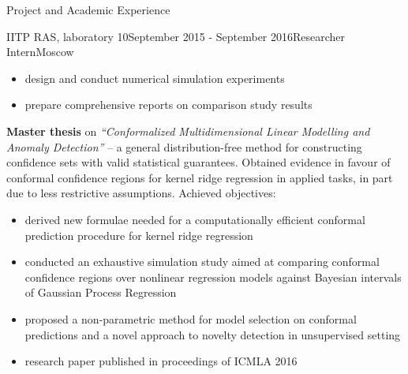 \documentclass{resume} %
\begin{document}
\begin{rSection}{Project and Academic Experience}
\begin{rSubsection}{IITP RAS, laboratory 10}{September 2015 - September 2016}{Researcher Intern}{Moscow}
\begin{itemize}
        \item design and conduct numerical simulation experiments

        \item prepare comprehensive reports on comparison study results
    \end{itemize}

    \medskip
    \item \textbf{Master thesis} on \textit{``Conformalized Multidimensional Linear
    Modelling and Anomaly Detection''} -- a general distribution-free method for
    constructing confidence sets with valid statistical guarantees. Obtained evidence
    in favour of conformal confidence regions for kernel ridge regression in applied
    tasks, in part due to less restrictive assumptions.
    Achieved objectives: \begin{itemize}
        \item derived new formulae needed for a computationally efficient conformal
        prediction procedure for kernel ridge regression

        \item conducted an exhaustive simulation study aimed at comparing conformal
        confidence regions over nonlinear regression models against Bayesian intervals
        of Gaussian Process Regression

        \item proposed a non-parametric method for model selection on conformal predictions
        and a novel approach to novelty detection in unsupervised setting

        \item research paper published in proceedings of ICMLA 2016
    \end{itemize}
\end{rSubsection}

\end{rSection}
\end{document}
